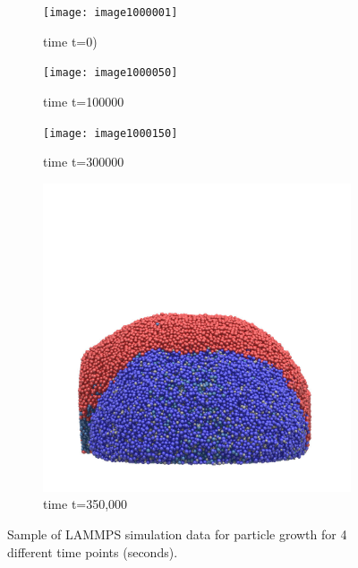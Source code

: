 \documentclass[12pt,titlepage]{report}
\theoremstyle{definition}
\theoremstyle{remark}
\begin{document}
\begin{figure}[!ht]
\begin{subfigure}[b]{.5\textwidth}
\texttt{[image: image1000001]}
\caption{time t=0)}
\label{}
\end{subfigure}%
\begin{subfigure}[b]{.5\textwidth}
\texttt{[image: image1000050]}
\caption{time t=100000}
\label{}
\end{subfigure}\vspace*{-.1em}
\begin{subfigure}[b]{.5\textwidth}
\texttt{[image: image1000150]}
\caption{time t=300000}
\label{}
\end{subfigure}\vspace*{-.1em}
\begin{subfigure}[b]{.5\textwidth}
\includegraphics[height=.4\textheight]{image1000175}
\caption{time t=350,000}
\end{subfigure}\vspace*{-.1em}
\caption{Sample of LAMMPS simulation data for particle growth for 4 different time points (seconds).}\label{myfig1}
\end{figure}
\end{document}
